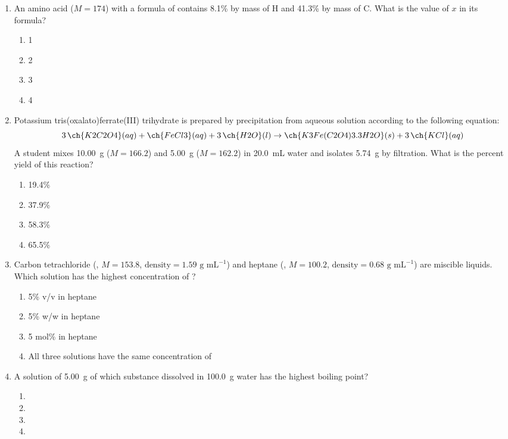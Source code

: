 \documentclass[twocolumn,10pt]{article}
\begin{document}
\begin{enumerate}[label=\arabic*., leftmargin=*]

\item An amino acid ($M=174$) with a formula of  contains 8.1\% by mass of H and 41.3\% by mass of C. What is the value of $x$ in its formula?
\begin{enumerate}[label=(\Alph*)]
    \item 1 \item 2 \item 3 \item 4
\end{enumerate}

\item Potassium tris(oxalato)ferrate(III) trihydrate is prepared by precipitation from aqueous solution according to the following equation:
\[ 3\,\ch{K2C2O4}(aq) + \ch{FeCl3}(aq) + 3\,\ch{H2O}(l) \rightarrow \ch{K3Fe(C2O4)3.3H2O}(s) + 3\,\ch{KCl}(aq) \]
A student mixes 10.00~g  ($M=166.2$) and 5.00~g  ($M=162.2$) in 20.0~mL water and isolates 5.74~g  by filtration. What is the percent yield of this reaction?
\begin{enumerate}[label=(\Alph*)]
    \item 19.4\% \item 37.9\% \item 58.3\% \item 65.5\%
\end{enumerate}

\item Carbon tetrachloride (, $M=153.8$, $\text{density} = 1.59\text{ g mL}^{-1}$) and heptane (, $M=100.2$, $\text{density} = 0.68\text{ g mL}^{-1}$) are miscible liquids. Which solution has the highest concentration of ?
\begin{enumerate}[label=(\Alph*)]
    \item 5\% v/v  in heptane
    \item 5\% w/w  in heptane
    \item 5 mol\%  in heptane
    \item All three solutions have the same concentration of 
\end{enumerate}

\item A solution of 5.00~g of which substance dissolved in 100.0~g water has the highest boiling point?
\begin{enumerate}[label=(\Alph*)]
    \item {} \item {} \item {} \item {}
\end{enumerate}


\end{enumerate}
\end{document}
